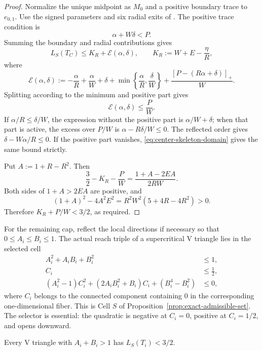 \begin{proof}
Normalize the unique midpoint as $M_0$ and a positive boundary trace to
$e_{0,1}$.  Use the signed parameters and six radial exits of
. The positive trace condition is
\begin{equation}
 \alpha+W\delta<P.
 \label{eq:center-skeleton-domain}
\end{equation}
Summing the boundary and radial contributions gives
\[
 L_S(T_C)\le K_R+\mathcal E(\alpha,\delta),
 \qquad K_R:=W+E-\frac\eta R,
\]
where
\[
 \mathcal E(\alpha,\delta)
 :=-\frac\alpha R+\frac\alpha W+\delta
 +\min\left\{\frac\alpha R,\frac\delta W\right\}
 +\frac{[P-(R\alpha+\delta)]_+}{W}.
\]
Splitting according to the minimum and positive part gives
\begin{equation}
 \mathcal E(\alpha,\delta)\le\frac PW.
 \label{eq:center-skeleton-E-bound}
\end{equation}
If $\alpha/R\le\delta/W$, the expression without the positive part is
$\alpha/W+\delta$; when that part is active, the excess over $P/W$ is
$\alpha-R\delta/W\le0$.  The reflected order gives
$\delta-W\alpha/R\le0$.  If the positive part vanishes,
\eqref{eq:center-skeleton-domain} gives the same bound strictly.

Put $A:=1+R-R^2$.  Then
\[
 \frac32-K_R-\frac PW=\frac{1+A-2EA}{2RW}.
\]
Both sides of $1+A>2EA$ are positive, and
\[
 (1+A)^2-4A^2E^2=R^2W^2(5+4R-4R^2)>0.
\]
Therefore $K_R+P/W<3/2$, as required.
\end{proof}


For the remaining cap, reflect the local directions if necessary so that
$0\le A_i\le B_i\le1$.  The actual reach triple of a supercritical V
triangle lies in the selected cell
\begin{equation}
\begin{aligned}
 A_i^2+A_iB_i+B_i^2&\le1,\\
 C_i&\le\frac12,\\
 (A_i^2-1)C_i^2+(2A_iB_i^2+B_i)C_i+(B_i^4-B_i^2)&\le0,
\end{aligned}
\label{eq:supercritical-admissible-cell}
\end{equation}
where $C_i$ belongs to the connected component containing $0$ in the
corresponding one-dimensional fiber.  This is Cell $S$ of
Proposition~\ref{prop:exact-admissible-set}.  The selector is essential: the
quadratic is negative at $C_i=0$, positive at $C_i=1/2$, and opens downward.

\begin{lemma}
\label{lem:app-supercritical-skeleton-calculation}
Every V triangle with $A_i+B_i>1$ has $L_S(T_i)<3/2$.
\end{lemma}

